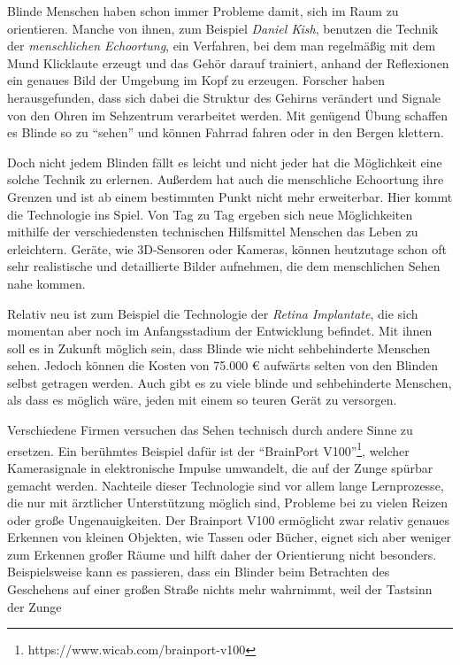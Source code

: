 \documentclass[a4paper,12pt,ngerman]{scrartcl}
\begin{document}
Blinde Menschen haben schon immer Probleme damit, sich im Raum zu orientieren.
Manche von ihnen, zum Beispiel \textit{Daniel Kish}, benutzen die Technik der 
\textit{menschlichen Echoortung}, ein Verfahren, bei dem
man regelmäßig mit dem Mund Klicklaute erzeugt und das Gehör darauf trainiert,
anhand der Reflexionen ein genaues Bild der Umgebung im Kopf zu erzeugen.
Forscher haben herausgefunden, dass sich dabei die Struktur des Gehirns verändert 
und Signale von den Ohren im Sehzentrum verarbeitet werden.
Mit genügend Übung schaffen es Blinde so zu \enquote{sehen} und können Fahrrad 
fahren oder in den Bergen klettern. \par 
Doch nicht jedem Blinden fällt es leicht und nicht jeder hat die Möglichkeit eine
solche Technik zu erlernen. Außerdem hat auch die menschliche Echoortung ihre
Grenzen und ist ab einem bestimmten Punkt nicht mehr erweiterbar. Hier kommt die 
Technologie ins Spiel. Von Tag zu Tag ergeben sich neue Möglichkeiten mithilfe 
der verschiedensten technischen Hilfsmittel Menschen das Leben zu erleichtern.
Geräte, wie 3D-Sensoren oder Kameras, können heutzutage schon oft sehr realistische
und detaillierte Bilder aufnehmen, die dem menschlichen Sehen nahe kommen. \par 
Relativ neu ist zum Beispiel die Technologie der \textit{Retina Implantate}, die sich 
momentan aber noch im Anfangsstadium der Entwicklung befindet. Mit ihnen soll es in 
Zukunft möglich sein, dass Blinde wie nicht sehbehinderte Menschen sehen. Jedoch
können die Kosten von 75.000 \euro{} aufwärts selten von den Blinden selbst getragen
werden. Auch gibt es zu viele
blinde und sehbehinderte Menschen, als dass es möglich wäre, jeden mit einem so 
teuren Gerät zu versorgen.\par 
Verschiedene Firmen versuchen das Sehen technisch durch andere Sinne zu ersetzen.
Ein berühmtes Beispiel dafür ist der 
\enquote{BrainPort V100}\footnote{https://www.wicab.com/brainport-v100}, welcher 
Kamerasignale in elektronische Impulse umwandelt, die auf der Zunge spürbar
gemacht werden. Nachteile dieser
Technologie sind vor allem lange Lernprozesse, die nur mit ärztlicher Unterstützung
möglich sind, Probleme bei zu vielen Reizen oder große Ungenauigkeiten. Der Brainport V100 ermöglicht
zwar relativ genaues Erkennen von kleinen Objekten, wie Tassen oder Bücher, eignet sich aber weniger zum
Erkennen großer Räume und hilft daher der Orientierung nicht besonders.
Beispielsweise kann es passieren, dass ein Blinder beim Betrachten des Geschehens auf 
einer großen Straße nichts mehr wahrnimmt, weil der Tastsinn der Zunge
\end{document}
